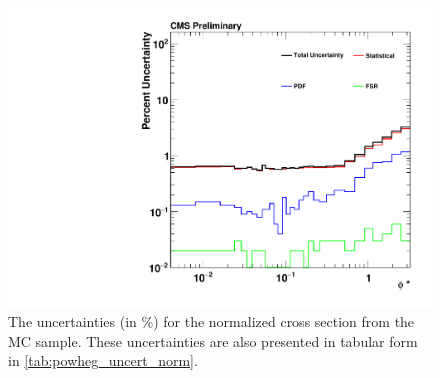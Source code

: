 \begin{figure}[!p]
    \centering
    \includegraphics[width=\textwidth]{figures/powheg_uncertainty_normalized.pdf}
    \caption[
        The uncertainties for the normalized cross section from the \POWHEG MC
        sample.
    ]{
        The uncertainties (in \%) for the normalized cross section from the
        \POWHEG MC sample. These uncertainties are also presented in tabular
        form in \cref{tab:powheg_uncert_norm}.
    }
    \label{fig:powheg_uncert_norm}
\end{figure}
